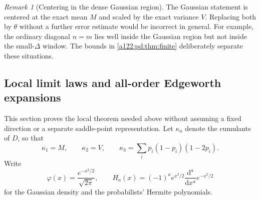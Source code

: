 \documentclass[11pt,letterpaper]{article}
\numberwithin{equation}{subsection}
\theoremstyle{definition}
\theoremstyle{remark}
\newtheorem{remark}[theorem]{Remark}
\theoremstyle{plain}
\begin{document}
\begin{remark}[Centering in the dense Gaussian region]
The Gaussian statement is centered at the exact mean $M$ and scaled by
the exact variance $V$. Replacing both by $\theta$ without a further
error estimate would be incorrect in general. For example, the ordinary
diagonal $n=m$ lies well inside the Gaussian region but not inside the
small-$\Delta$ window. The bounds in \cref{a122:pd:thm:finite} deliberately
separate these situations.
\end{remark}

\subsection{Local limit laws and all-order Edgeworth expansions}
\label{a122:pd:sec:local}
This section proves the local theorem needed above without assuming a
fixed direction or a separate saddle-point representation. Let
$\kappa_a$ denote the cumulants of $D$, so that
\[
 \kappa_1=M,\qquad \kappa_2=V,\qquad
 \kappa_3=\sum_i p_i(1-p_i)(1-2p_i).
\]
Write
\[
 \varphi(x)=\frac{e^{-x^2/2}}{\sqrt{2\pi}},\qquad
 H_a(x)=(-1)^a e^{x^2/2}\frac{\mathrm d^a}{\mathrm dx^a}e^{-x^2/2}
\]
for the Gaussian density and the probabilists' Hermite polynomials.
\end{document}
